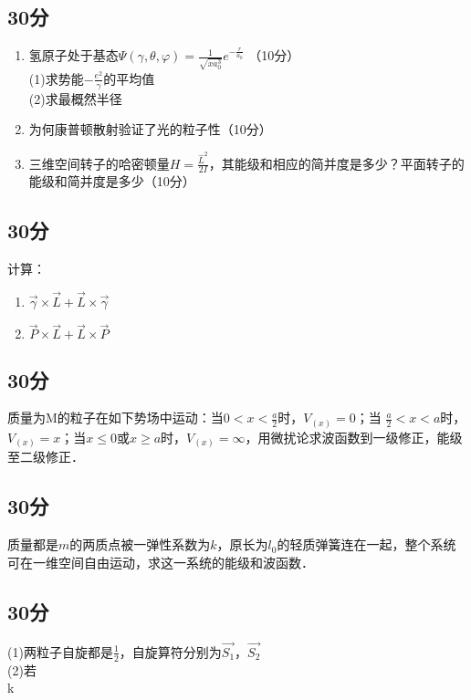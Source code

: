 
\subsection{30分}
\begin{enumerate}
\item 氢原子处于基态$\varPsi(\gamma,\theta,\varphi)=\frac{1}{\sqrt{xa^{3}_{0}}}e^{-\frac{r}{a_0}}$ （10分）\\
(1)求势能$-\frac{e^2}{\gamma}$的平均值\\
(2)求最概然半径\\
\item 为何康普顿散射验证了光的粒子性（10分）\\
\item 三维空间转子的哈密顿量$H=\frac{\hat{L}^2}{2I}$，其能级和相应的简并度是多少？平面转子的能级和简并度是多少（10分）\\
\end{enumerate}
\subsection{30分}
计算：\\
\begin{enumerate}
\item $\vec{\gamma}\times \vec{L}+ \vec{L}\times \vec{\gamma}$
\item $\vec{P}\times\vec{L}+\vec{L}\times\vec{P}$
\end{enumerate}
\subsection{30分}
质量为M的粒子在如下势场中运动：当$0<x<\frac{a}{2}$时，$V_{(x)}=0$；当 $\frac{a}{2} <x<a$时，$V_{(x)}=x$；当$x \le 0$或$x \ge a$时，$V_{(x)}=\infty$，用微扰论求波函数到一级修正，能级至二级修正．
\subsection{30分}
质量都是$m$的两质点被一弹性系数为$k$，原长为$l_{0}$的轻质弹簧连在一起，整个系统可在一维空间自由运动，求这一系统的能级和波函数．
\subsection{30分}
(1)两粒子自旋都是$\frac{1}{2}$，自旋算符分别为$\vec{S_{1}}$，$\vec{S_{2}}$\\
(2)若\\
k